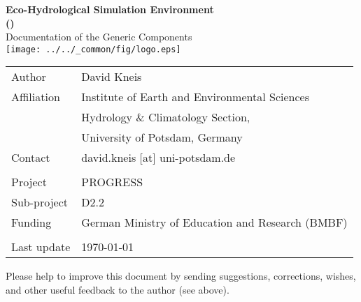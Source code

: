 \documentclass[a4paper,twocolumn,10pt,fleqn]{book}
\begin{document}

\pagestyle{empty}
\onecolumn

\begin{center}
  \vspace*{5cm}
  \LARGE
  \textbf{Eco-Hydrological Simulation Environment \\ ()} \\
  \vspace*{1.2cm}
  Documentation of the Generic Components \\
  \vspace*{2.0cm}
  \texttt{[image: ../../\_common/fig/logo.eps]}
\end{center}

\cleardoublepage

\vspace*{12cm}
\begin{tabular}{ll}
Author      & David Kneis \\
Affiliation & Institute of Earth and Environmental Sciences \\
            & Hydrology \& Climatology Section, \\
            & University of Potsdam, Germany \\
Contact     & david.kneis [at] uni-potsdam.de \\
            & \\
Project     & PROGRESS \\
Sub-project & D2.2 \\
Funding     & German Ministry of Education and Research (BMBF) \\
            & \\
Last update & \today{} \\
\end{tabular}

\vspace*{2.0cm}
\noindent Please help to improve this document by sending suggestions, corrections, wishes, and other useful feedback to the author (see above).

\cleardoublepage

\end{document}
